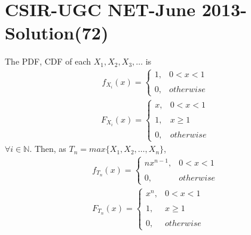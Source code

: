 \documentclass[journal,12pt,twocolumn]{IEEEtran}
\begin{document}
\section*{CSIR-UGC NET-June 2013-Solution(72)}
\begin{comment}
\begin{itemize}
\item Convergence in Distribution :\\
A sequence of random variables $X_{1},X_{2},X_{3},\dots$ converges in distribution to a random variable $X$, shown by $X_{n}\xrightarrow[]{d}X$, if
\begin{align}
\tag{72.1}
    \displaystyle\lim_{n\to\infty}F_{X_{n}}(x)=F_{X}(x)
\end{align}
for all $x$ at which $F_{X}(x)$ is continuous.\\
\item Convergence in Probability :\\
A sequence of random variables $X_{1},X_{2},X_{3},\dots$ converges in probability to a random variable $X$, shown by $X_{n}\xrightarrow[]{p}X$, if
\begin{align}
\tag{72.2}
    \displaystyle\lim_{n\to\infty}\pr{|X_{n}-X|\geq\epsilon}=0,\forall\epsilon>0
\end{align}
\end{itemize}
\end{comment}
The PDF, CDF of each $X_{1},X_{2},X_{3},\dots$ is 
\begin{align}
\tag{72.1}
    f_{X_{i}}(x)=\begin{cases}
	1, & 0< x<1 \\~\\[-1em]
	0, & otherwise
	\end{cases} 
\end{align}
\begin{align}
\tag{72.2}
	F_{X_{i}}(x)=\begin{cases}
	x, & 0< x<1 \\~\\[-1em]
	1, & x\geq 1\\~\\[-1em]
	0, & otherwise
	\end{cases} 
\end{align}
$\forall i\in \mathbb{N}$.
Then, as $T_{n}=max\{ X_{1},X_{2},\dots,X_{n}\}$,
\begin{align}
\tag{72.3}
    f_{T_{n}}(x)=\begin{cases}
	nx^{n-1}, & 0< x<1 \\~\\[-1em]
	0, & otherwise
	\end{cases} \\
\tag{72.4}
	F_{T_{n}}(x)=\begin{cases}
	x^{n}, & 0< x<1 \\~\\[-1em]
	1, & x\geq 1\\~\\[-1em]
	0, & otherwise
	\end{cases} 
\end{align}
\end{document}
